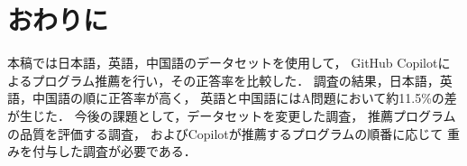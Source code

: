 \section{おわりに\label{conclusion}}
  本稿では日本語，英語，中国語のデータセットを使用して，
  GitHub Copilotによるプログラム推薦を行い，その正答率を比較した．
  調査の結果，日本語，英語，中国語の順に正答率が高く，
  英語と中国語にはA問題において約11.5\%の差が生じた．
  今後の課題として，データセットを変更した調査，
  推薦プログラムの品質を評価する調査，
  およびCopilotが推薦するプログラムの順番に応じて
  重みを付与した調査が必要である．
  
